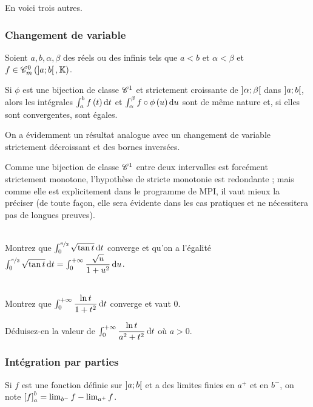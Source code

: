 En voici trois autres.

\subsubsection{Changement de variable}

\begin{prop}
Soient \(a,b,\alpha,\beta\) des réels ou des infinis tels que \(a<b\) et \(\alpha<\beta\) et \(f\in\contm[\intervee{a}{b}]\).

Si \(\phi\) est une bijection de classe \(\mathscr{C}^{1}\) et strictement croissante de \(\left]\alpha;\beta\right[\) dans \(\left]a;b\right[\), alors les intégrales \(\int_a^bf\paren{t}\odif{t}\) et \(\int_\alpha^\beta f\rond\phi\paren{u}\odif{u}\) sont de même nature et, si elles sont convergentes, sont égales.
\end{prop}

\begin{rem}
On a évidemment un résultat analogue avec un changement de variable strictement décroissant et des bornes inversées.

Comme une bijection de classe \(\mathscr{C}^{1}\) entre deux intervalles est forcément strictement monotone, l'hypothèse de stricte monotonie est redondante ; mais comme elle est explicitement dans le programme de MPI, il vaut mieux la préciser (de toute façon, elle sera évidente dans les cas pratiques et ne nécessitera pas de longues preuves).
\end{rem}

\begin{exo}~\\
Montrez que \(\int_0^{\nicefrac{\pi}{2}}\sqrt{\tan t}\odif{t}\) converge et qu'on a l'égalité \(\int_0^{\nicefrac{\pi}{2}}\sqrt{\tan t}\odif{t}=\int_0^{\pinf}\dfrac{\sqrt{u}}{1+u^2}\odif{u}\).
\end{exo}

\begin{exo}~\\
Montrez que \(\int_0^{\pinf}\dfrac{\ln t}{1+t^2}\odif{t}\) converge et vaut \(0\).

Déduisez-en la valeur de \(\int_0^{\pinf}\dfrac{\ln t}{a^2+t^2}\odif{t}\) où \(a>0\).
\end{exo}

\subsubsection{Intégration par parties}

Si \(f\) est une fonction définie sur \(\left]a;b\right[\) et a des limites finies en \(a^+\) et en \(b^-\), on note \(\left[f\right]_a^b=\lim_{b^-}f-\lim_{a^+}f\).

